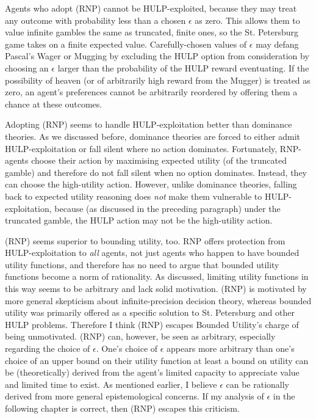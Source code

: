 \documentclass{article}
\begin{document}
Agents who adopt (RNP) cannot be HULP-exploited, because they may treat any outcome with probability less than a chosen \(\epsilon\) as zero. This allows them to value infinite gambles the same as truncated, finite ones, so the St. Petersburg game takes on a finite expected value. Carefully-chosen values of \(\epsilon\) may defang Pascal's Wager or Mugging by excluding the HULP option from consideration by choosing an \(\epsilon\) larger than the probability of the HULP reward eventuating. If the possibility of heaven (or of arbitrarily high reward from the Mugger) is treated as zero, an agent's preferences cannot be arbitrarily reordered by offering them a chance at these outcomes.

Adopting (RNP) seems to handle HULP-exploitation better than dominance theories. As we discussed before, dominance theories are forced to either admit HULP-exploitation or fall silent where no action dominates. Fortunately, RNP-agents choose their action by maximising expected utility (of the truncated gamble) and therefore do not fall silent when no option dominates. Instead, they can choose the high-utility action. However, unlike dominance theories, falling back to expected utility reasoning does \textit{not} make them vulnerable to HULP-exploitation, because (as discussed in the preceding paragraph) under the truncated gamble, the HULP action may not be the high-utility action. 

(RNP) seems superior to bounding utility, too. RNP offers protection from HULP-exploitation to \textit{all} agents, not just agents who happen to have bounded utility functions, and therefore has no need to argue that bounded utility functions become a norm of rationality. As discussed, limiting utility functions in this way seems to be arbitrary and lack solid motivation. (RNP) is motivated by more general skepticism about infinite-precision decision theory, whereas bounded utility was primarily offered as a specific solution to St. Petersburg and other HULP problems. Therefore I think (RNP) escapes Bounded Utility's charge of being unmotivated. (RNP) can, however, be seen as arbitrary, especially regarding the choice of \(\epsilon\). One's choice of \(\epsilon\) appears more arbitrary than one's choice of an upper bound on their utility function \textemdash{} at least a bound on utility can be (theoretically) derived from the agent's limited capacity to appreciate value and limited time to exist. As mentioned earlier, I believe \(\epsilon\) can be rationally derived from more general epistemological concerns. If my analysis of \(\epsilon\) in the following chapter is correct, then (RNP) escapes this criticism.
\end{document}
